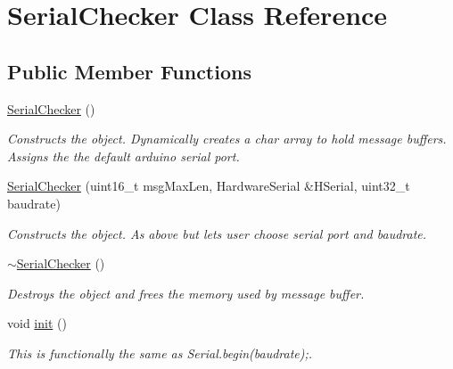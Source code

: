 \hypertarget{class_serial_checker}{}\section{Serial\+Checker Class Reference}
\label{class_serial_checker}
\subsection*{Public Member Functions}
\begin{DoxyCompactItemize}
\item 
\mbox{\label{class_serial_checker_a7f23a95e895512932a0d88a0ba5af974}} 
\mbox{\hyperlink{class_serial_checker_a7f23a95e895512932a0d88a0ba5af974}{Serial\+Checker}} ()
\begin{DoxyCompactList}\small\item\em Constructs the object. Dynamically creates a char array to hold message buffers. Assigns the the default arduino serial port. \end{DoxyCompactList}\item 
\mbox{\hyperlink{class_serial_checker_aed7c7c73e206eec95c45dc944c673345}{Serial\+Checker}} (uint16\+\_\+t msg\+Max\+Len, Hardware\+Serial \&H\+Serial, uint32\+\_\+t baudrate)
\begin{DoxyCompactList}\small\item\em Constructs the object. As above but lets user choose serial port and baudrate. \end{DoxyCompactList}\item 
\mbox{\label{class_serial_checker_a1ca323a32d359fea2bce35d7612571cb}} 
\mbox{\hyperlink{class_serial_checker_a1ca323a32d359fea2bce35d7612571cb}{$\sim$\+Serial\+Checker}} ()
\begin{DoxyCompactList}\small\item\em Destroys the object and frees the memory used by message buffer. \end{DoxyCompactList}\item 
\mbox{\label{class_serial_checker_a5cbd74025842627773de3db1f4c5d035}} 
void \mbox{\hyperlink{class_serial_checker_a5cbd74025842627773de3db1f4c5d035}{init}} ()
\begin{DoxyCompactList}\small\item\em This is functionally the same as Serial.\+begin(baudrate);. \end{DoxyCompactList}\item 

\end{DoxyCompactItemize}
